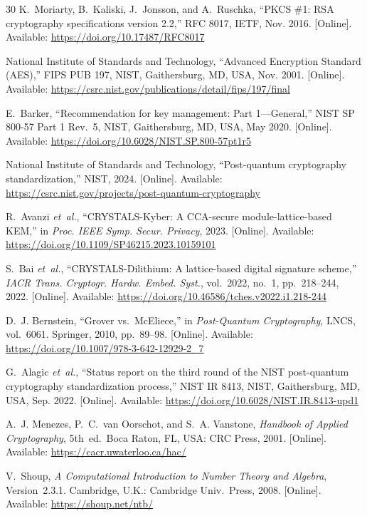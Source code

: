 \documentclass[journal]{IEEEtran}
\begin{document}
\begin{thebibliography}{30}
K.~Moriarty, B.~Kaliski, J.~Jonsson, and A.~Ruschka, ``PKCS \#1: RSA cryptography specifications version 2.2,'' RFC 8017, IETF, Nov. 2016. [Online]. Available: \url{https://doi.org/10.17487/RFC8017}

National Institute of Standards and Technology, ``Advanced Encryption Standard (AES),'' FIPS PUB 197, NIST, Gaithersburg, MD, USA, Nov. 2001. [Online]. Available: \url{https://csrc.nist.gov/publications/detail/fips/197/final}

E.~Barker, ``Recommendation for key management: Part 1---General,'' NIST SP 800-57 Part 1 Rev.~5, NIST, Gaithersburg, MD, USA, May 2020. [Online]. Available: \url{https://doi.org/10.6028/NIST.SP.800-57pt1r5}

National Institute of Standards and Technology, ``Post-quantum cryptography standardization,'' NIST, 2024. [Online]. Available: \url{https://csrc.nist.gov/projects/post-quantum-cryptography}

R.~Avanzi \textit{et~al.}, ``CRYSTALS-Kyber: A CCA-secure module-lattice-based KEM,'' in \textit{Proc. IEEE Symp. Secur. Privacy}, 2023. [Online]. Available: \url{https://doi.org/10.1109/SP46215.2023.10159101}

S.~Bai \textit{et~al.}, ``CRYSTALS-Dilithium: A lattice-based digital signature scheme,'' \textit{IACR Trans. Cryptogr. Hardw. Embed. Syst.}, vol.~2022, no.~1, pp.~218--244, 2022. [Online]. Available: \url{https://doi.org/10.46586/tches.v2022.i1.218-244}

D.~J. Bernstein, ``Grover vs.\ McEliece,'' in \textit{Post-Quantum Cryptography}, LNCS, vol.~6061. Springer, 2010, pp.~89--98. [Online]. Available: \url{https://doi.org/10.1007/978-3-642-12929-2_7}

G.~Alagic \textit{et~al.}, ``Status report on the third round of the NIST post-quantum cryptography standardization process,'' NIST IR 8413, NIST, Gaithersburg, MD, USA, Sep. 2022. [Online]. Available: \url{https://doi.org/10.6028/NIST.IR.8413-upd1}

A.~J. Menezes, P.~C.~van Oorschot, and S.~A. Vanstone, \textit{Handbook of Applied Cryptography}, 5th~ed.\ Boca Raton, FL, USA: CRC Press, 2001. [Online]. Available: \url{https://cacr.uwaterloo.ca/hac/}

V.~Shoup, \textit{A Computational Introduction to Number Theory and Algebra}, Version~2.3.1. Cambridge, U.K.: Cambridge Univ.\ Press, 2008. [Online]. Available: \url{https://shoup.net/ntb/}


\end{thebibliography}
\end{document}
